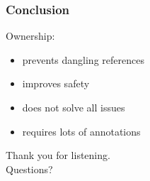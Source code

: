 \documentclass[xcolor=colortbl
]{beamer}
\begin{document}
\begin{frame}
    \frametitle{Conclusion}
    
    Ownership:
    \begin{itemize}
        \item prevents dangling references
        \item improves safety
        \item does not solve all issues
        \item requires lots of annotations
    \end{itemize}
\end{frame}

\begin{frame}        
        \Huge{Thank you for listening. \\
            Questions?}
\end{frame}
\end{document}
